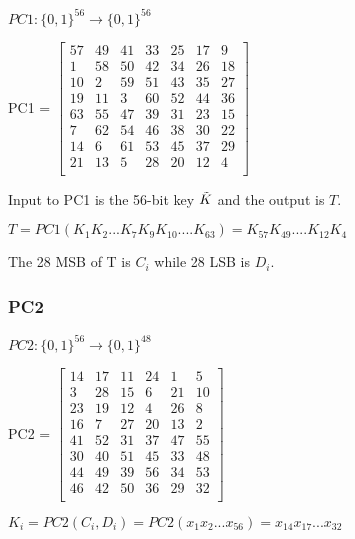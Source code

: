 \documentclass[11pt]{article}
\begin{document}
\begin{center}
    $PC1: \{0, 1\}^{56} \rightarrow \{0, 1\}^{56}$\\
\end{center}

\begin{center}
PC1 =  
    $\begin{bmatrix}
    57 & 49 & 41 & 33 & 25 & 17 & 9\\
    1 & 58 & 50 & 42 & 34 & 26 & 18\\
    10 & 2 & 59 & 51 & 43 & 35 & 27\\
    19 & 11 & 3 & 60 & 52 & 44 & 36\\
    63 & 55 & 47 & 39 & 31 & 23 & 15\\
    7 & 62 & 54 & 46 & 38 & 30 & 22\\
    14 & 6 & 61 & 53 & 45 & 37 & 29\\
    21 & 13 & 5 & 28 & 20 & 12 & 4\\
    \end{bmatrix}$
\end{center}
 Input to PC1 is the 56-bit key $\Tilde{K}$ and the output is $T$.
 \begin{center}
     $T = PC1(K_1K_2...K_7K_9K_{10}....K_{63}) = K_{57}K_{49}....K_{12}K_4$
 \end{center}
 The 28 MSB of T is $C_i$ while 28 LSB is $D_i$.

 \subsubsection{PC2}
\begin{center}
    $PC2: \{0, 1\}^{56} \rightarrow \{0, 1\}^{48}$\\
\end{center}
\begin{center}
    PC2 = 
    $\begin{bmatrix}
        14 & 17 & 11 & 24 & 1 & 5\\
        3 & 28 & 15 & 6 & 21 & 10\\
        23 & 19 & 12 & 4 & 26 & 8\\
        16 & 7 & 27 & 20 & 13 & 2\\
        41 & 52 & 31 & 37 & 47 & 55\\
        30 & 40 & 51 & 45 & 33 & 48\\
        44 & 49 & 39 & 56 & 34 & 53\\
        46 & 42 & 50 & 36 & 29 & 32\\
    \end{bmatrix}$
\end{center}
\begin{center}
    $K_i = PC2(C_i, D_i) = PC2(x_1x_2...x_{56}) = x_{14}x_{17}...x_{32}$
\end{center}
\end{document}
